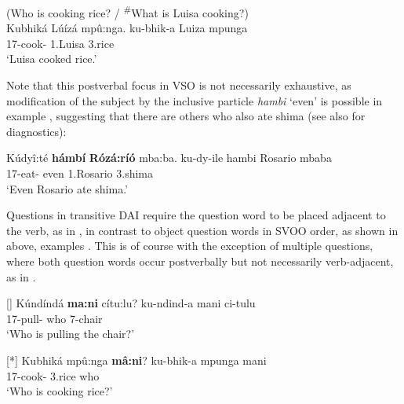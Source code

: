 \documentclass[output=paper]{langscibook}
\begin{document}
\z

\ea
\label{bkm:Ref121990860}
(Who is cooking rice? / \textsuperscript{\#}What is Luisa cooking?)\\
Kubhiká Lúízá mpû:nga.  \jambox*{[VSO]}
\gll
ku-bhik-a  Luiza  mpunga\\
17\SM{}-cook-\FV{}  1.Luisa  3.rice\\
\glt
‘Luisa cooked rice.’\\

\z

Note that this postverbal focus in VSO is not necessarily exhaustive, as modification of the subject by the inclusive particle \textit{hambi} ‘even’ is possible in example , suggesting that there are others who also ate shima (see also \citealt{chapters/intro} for diagnostics):

\ea
\label{bkm:Ref146272393}
Kúdyî:té \textbf{hámbí} \textbf{Rózá:ríó} mba:ba.   \jambox*{[VSO]}
\gll
ku-dy-ile  hambi  Rosario  mbaba\\
17\SM{}-eat-\PFV{}  even  1.Rosario  3.shima\\
\glt
‘Even Rosario ate shima.’\\

\z

Questions in transitive DAI require the question word to be placed adjacent to the verb, as in , in contrast to object question words in SVOO order, as shown in  above, examples . This is of course with the exception of multiple questions, where both question words occur postverbally but not necessarily verb-adjacent, as in .

\ea\label{bkm:Ref120691162}
\ea
[]{
Kúndíndá \textbf{ma:ni} cítu:lu? \jambox*{[VSO]}
\gll
ku-ndind-a  mani  ci-tulu\\
17\SM{}-pull-\FV{}  who  7-chair\\
\glt
‘Who is pulling the chair?’\\
}


\ex
[*]{
Kubhiká mpû:nga \textbf{mâ:ni}? \jambox*{[*VOS]}
\gll
ku-bhik-a  mpunga  mani\\
17\SM{}-cook-\FV{}  3.rice  who\\
\glt
‘Who is cooking rice?’\\
}
\end{document}
